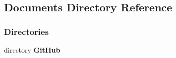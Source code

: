 \subsection{Documents Directory Reference}
\label{dir_17a255cfad529e2205e09a8927253531}
\subsubsection*{Directories}
\begin{DoxyCompactItemize}
\item 
directory \textbf{ Git\+Hub}
\end{DoxyCompactItemize}
